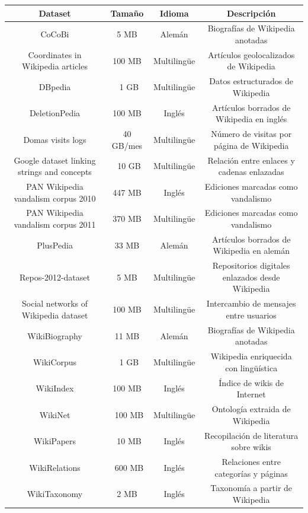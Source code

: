 \documentclass[11pt,onecolumn]{article}
\begin{document}
\begin{table}
\centering
\begin{tabular}{| c | c | c | c |}
\hline
\textbf{Dataset} & \textbf{Tamaño} & \textbf{Idioma} & \textbf{Descripción} \\
\hline
CoCoBi & 5 MB & Alemán & Biografías de Wikipedia anotadas \\ \hline 
Coordinates in Wikipedia articles & 100 MB & Multilingüe & Artículos geolocalizados de Wikipedia \\ \hline 
DBpedia & ~1 GB & Multilingüe & Datos estructurados de Wikipedia \\ \hline 
DeletionPedia & 100 MB & Inglés & Artículos borrados de Wikipedia en inglés \\ \hline 
Domas visits logs & 40 GB/mes & Multilingüe & Número de visitas por página de Wikipedia \\ \hline 
Google dataset linking strings and concepts & ~10 GB & Multilingüe & Relación entre enlaces y cadenas enlazadas \\ \hline 
PAN Wikipedia vandalism corpus 2010 & 447 MB & Inglés & Ediciones marcadas como vandalismo \\ \hline 
PAN Wikipedia vandalism corpus 2011 & 370 MB & Multilingüe & Ediciones marcadas como vandalismo \\ \hline 
PlusPedia & 33 MB & Alemán & Artículos borrados de Wikipedia en alemán \\ \hline 
Repos-2012-dataset & 5 MB & Multilingüe & Repositorios digitales enlazados desde Wikipedia \\ \hline 
Social networks of Wikipedia dataset & 100 MB & Multilingüe & Intercambio de mensajes entre usuarios \\ \hline 
WikiBiography & 11 MB & Alemán & Biografías de Wikipedia anotadas \\ \hline 
WikiCorpus & ~1 GB & Multilingüe & Wikipedia enriquecida con lingüística \\ \hline 
WikiIndex & 100 MB & Inglés & Índice de wikis de Internet \\ \hline 
WikiNet & ~100 MB & Multilingüe & Ontología extraida de Wikipedia \\ \hline 
WikiPapers & ~10 MB & Inglés & Recopilación de literatura sobre wikis \\ \hline 
WikiRelations & ~600 MB & Inglés & Relaciones entre categorías y páginas \\ \hline 
WikiTaxonomy & 2 MB & Inglés & Taxonomía a partir de Wikipedia \\ \hline 

\end{tabular}
\end{table}
\end{document}
